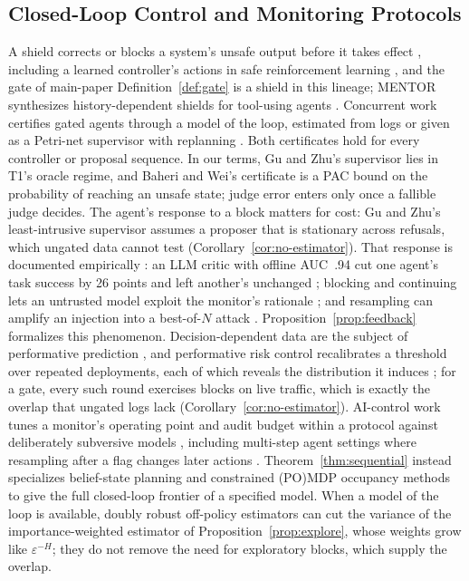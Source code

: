 \subsection{Closed-Loop Control and Monitoring Protocols}
A shield corrects or blocks a system's unsafe output before it takes effect
\citep{bloem2015shield}, including a learned controller's actions in safe
reinforcement learning \citep{alshiekh2018shielding,jansen2020probshields}, and
the gate of main-paper Definition~\ref{def:gate} is a shield in this lineage; MENTOR synthesizes
history-dependent shields for tool-using agents \citep{anand2026mentor}.
Concurrent work certifies gated agents through a model of the loop, estimated
from logs \citep{baheri2026controller} or given as a Petri-net supervisor with
replanning \citep{gu2026certified}. Both certificates hold for every controller or proposal
sequence. In our terms, Gu and Zhu's supervisor lies in T1's oracle regime, and Baheri and Wei's
certificate is a PAC bound on the probability of reaching an unsafe state; judge error enters only
once a fallible judge decides. The agent's response to a block matters for cost: Gu
and Zhu's least-intrusive supervisor assumes a proposer that is stationary
across refusals, which ungated data cannot test
(Corollary~\ref{cor:no-estimator}). That response is documented empirically \citep{sah2026verifier}: an LLM critic with offline AUC~.94 cut
one agent's task success by 26 points and left another's unchanged
\citep{vasudev2026accurate}; blocking and continuing lets an untrusted model
exploit the monitor's rationale \citep{lucassen2026retrying}; and resampling
can amplify an injection into a best-of-$N$ attack
\citep{terekhov2026adaptive}. Proposition~\ref{prop:feedback} formalizes this
phenomenon. Decision-dependent data are the subject of performative prediction
\citep{perdomo2020performative}, and performative risk control recalibrates a threshold over
repeated deployments, each of which reveals the distribution it induces
\citep{li2025performative}; for a gate, every such round exercises blocks on live traffic, which
is exactly the overlap that ungated logs lack (Corollary~\ref{cor:no-estimator}). AI-control work tunes a monitor's operating point and audit
budget within a protocol against deliberately subversive models \citep{greenblatt2024aicontrol,griffin2024games,hua2025combining}, including multi-step
agent settings where resampling after a flag changes later actions \citep{bhatt2025ctrlz}. Theorem~\ref{thm:sequential}
instead specializes belief-state planning \citep{kaelbling1998pomdp} and
constrained (PO)MDP occupancy methods
\citep{altman1999constrained,poupart2015cpomdp,walraven2018cpomdp} to give the
full closed-loop frontier of a specified model. When a model of the loop is available, doubly
robust off-policy estimators \citep{jiang2016doubly} can cut the variance of the
importance-weighted estimator of Proposition~\ref{prop:explore}, whose weights grow like
$\varepsilon^{-H}$; they do not remove the need for exploratory blocks, which supply the overlap.

